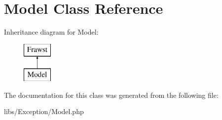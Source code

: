 \hypertarget{classModel}{
\section{Model Class Reference}
\label{classModel}
}
Inheritance diagram for Model:\begin{figure}[H]
\begin{center}
\leavevmode
\includegraphics[height=2.000000cm]{classModel}
\end{center}
\end{figure}


The documentation for this class was generated from the following file:\begin{DoxyCompactItemize}
\item 
libs/Exception/Model.php\end{DoxyCompactItemize}
